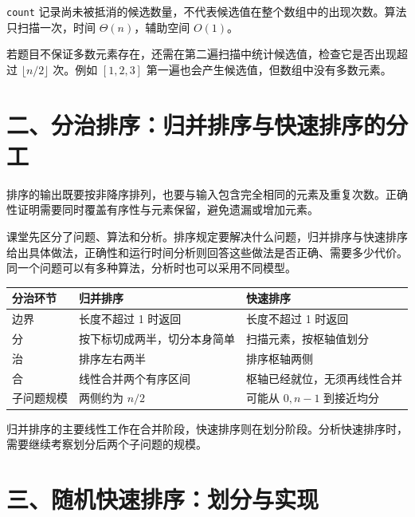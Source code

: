 \documentclass[
  UTF8,fontset=none,zihao=5]{ctexart}
\let\OldSection\section
\renewcommand{\section}{\Needspace{5\baselineskip}\OldSection}
\begin{document}
\texttt{count}
记录尚未被抵消的候选数量，不代表候选值在整个数组中的出现次数。算法只扫描一次，时间
\(\Theta(n)\)，辅助空间 \(O(1)\)。

若题目不保证多数元素存在，还需在第二遍扫描中统计候选值，检查它是否出现超过
\(\lfloor n/2\rfloor\) 次。例如 \([1,2,3]\)
第一遍也会产生候选值，但数组中没有多数元素。

\hypertarget{ux4e8cux5206ux6cbbux6392ux5e8fux5f52ux5e76ux6392ux5e8fux4e0eux5febux901fux6392ux5e8fux7684ux5206ux5de5}{%
\section{二、分治排序：归并排序与快速排序的分工}\label{ux4e8cux5206ux6cbbux6392ux5e8fux5f52ux5e76ux6392ux5e8fux4e0eux5febux901fux6392ux5e8fux7684ux5206ux5de5}}

排序的输出既要按非降序排列，也要与输入包含完全相同的元素及重复次数。正确性证明需要同时覆盖有序性与元素保留，避免遗漏或增加元素。

课堂先区分了问题、算法和分析。排序规定要解决什么问题，归并排序与快速排序给出具体做法，正确性和运行时间分析则回答这些做法是否正确、需要多少代价。同一个问题可以有多种算法，分析时也可以采用不同模型。

\begin{longtable}[]{@{}
  >{\raggedright\arraybackslash}p{}
  >{\raggedright\arraybackslash}p{}
  >{\raggedright\arraybackslash}p{}@{}}
\toprule
分治环节 & 归并排序 & 快速排序 \\
\midrule
\endhead
边界 & 长度不超过 1 时返回 & 长度不超过 1 时返回 \\
分 & 按下标切成两半，切分本身简单 & 扫描元素，按枢轴值划分 \\
治 & 排序左右两半 & 排序枢轴两侧 \\
合 & 线性合并两个有序区间 & 枢轴已经就位，无须再线性合并 \\
子问题规模 & 两侧约为 \(n/2\) & 可能从 \(0,n-1\) 到接近均分 \\
\bottomrule
\end{longtable}

归并排序的主要线性工作在合并阶段，快速排序则在划分阶段。分析快速排序时，需要继续考察划分后两个子问题的规模。

\hypertarget{ux4e09ux968fux673aux5febux901fux6392ux5e8fux5212ux5206ux4e0eux5b9eux73b0}{%
\section{三、随机快速排序：划分与实现}\label{ux4e09ux968fux673aux5febux901fux6392ux5e8fux5212ux5206ux4e0eux5b9eux73b0}}
\end{document}
